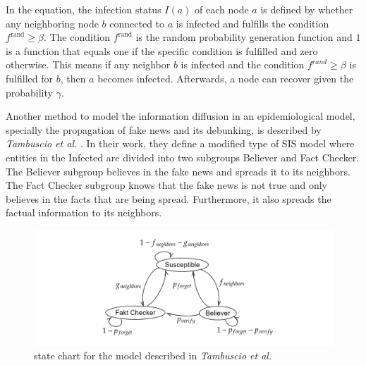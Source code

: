 In the equation, the infection status $I(a)$ of each node $a$ is defined 
by whether any neighboring node $b$ connected to $a$ is infected 
and fulfills the condition $f^{\mathrm{rand}}\geq \beta$.
The condition $f^{\mathrm{rand}}$ is the random probability generation function and $1$ 
is a function that equals one if the specific condition is fulfilled and 
zero otherwise. This means if any neighbor $b$ is infected and the 
condition $f^{rand}\geq \beta$ is fulfilled for $b$, then $a$ becomes infected. 
Afterwards, a node can recover given the probability $\gamma$.

Another method to model the information diffusion in an epidemiological model, 
specially the propagation of fake news and its debunking,
is described by \textit{Tambuscio et al.} \cite{sirsmodel}. In their work, they
define a modified type of SIS model where entities in the \glqq Infected\grqq{} 
are divided into two subgroups \glqq Believer\grqq{} and
\glqq Fact Checker\grqq{}.
The \glqq Believer\grqq{} subgroup believes in the fake news and spreads it 
to its neighbors.
The \glqq Fact Checker\grqq{} subgroup knows that the fake news is not 
true and only believes in the facts that are being spread. Furthermore, it
also spreads the factual information to its neighbors.

\begin{figure}[!ht]
    \center
    \includegraphics[scale=.15]{figs/Tambuscio.png}
    \caption{state chart for the model described
    in \textit{Tambuscio et al.} \cite{sirsmodel}}
    \label{originalmodelstatechart}
\end{figure}

